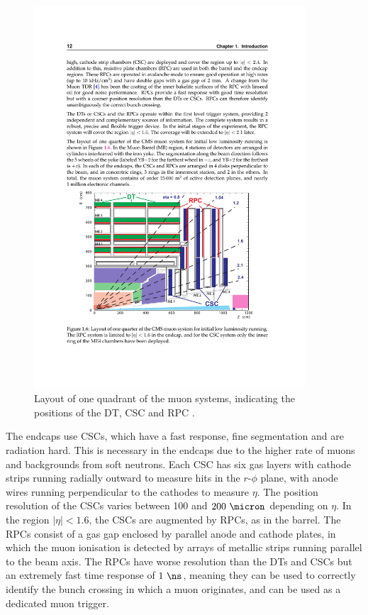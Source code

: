 \begin{figure}[htbp]
   \includegraphics[width=0.9\textwidth]{plots/detector/muon_layout.pdf}
\caption[Layout of one quadrant of the muon systems.]{
    Layout of one quadrant of the muon systems, indicating the positions
of the DT, CSC and RPC \cite{TDR}.}
\label{fig:muondetectors}
\end{figure}

The endcaps use \ac{CSC}s, which have a fast response, fine segmentation and are
radiation hard. This is necessary in the endcaps due to the higher rate of muons
and backgrounds from soft neutrons. Each \ac{CSC} has six gas layers with cathode strips running
radially outward to measure hits in the $r$-$\phi$ plane, with anode wires
running perpendicular to the cathodes to measure $\eta$. The position resolution
of the \ac{CSC}s varies between 100 and $200~\micron$ depending on $\eta$. In the region
$|\eta|<1.6$, the \ac{CSC}s are augmented by \ac{RPC}s, as in the barrel. The
\ac{RPC}s consist of a gas gap enclosed by parallel anode and cathode plates, in
which the muon ionisation is detected by arrays of metallic strips running
parallel to the beam axis. The \ac{RPC}s have worse resolution than the \ac{DT}s
and \ac{CSC}s but an extremely fast time response of
$1~\ns$, meaning they can be used to correctly identify the bunch crossing in
which a muon originates, and can be used as a dedicated muon trigger.


